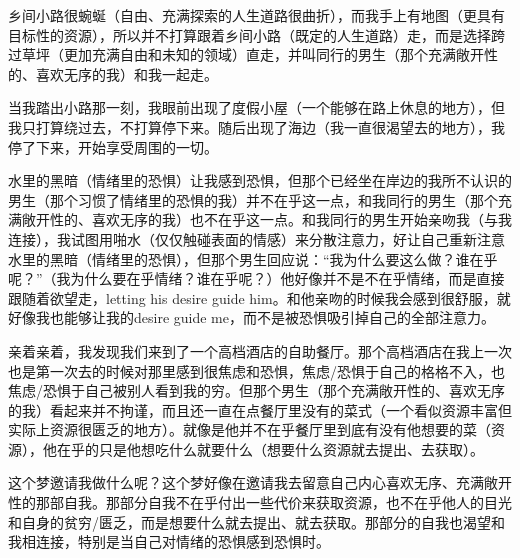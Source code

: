 乡间小路很蜿蜒（自由、充满探索的人生道路很曲折），而我手上有地图（更具有目标性的资源），所以并不打算跟着乡间小路（既定的人生道路）走，而是选择跨过草坪（更加充满自由和未知的领域）直走，并叫同行的男生（那个充满敞开性的、喜欢无序的我）和我一起走。

当我踏出小路那一刻，我眼前出现了度假小屋（一个能够在路上休息的地方），但我只打算绕过去，不打算停下来。随后出现了海边（我一直很渴望去的地方），我停了下来，开始享受周围的一切。

水里的黑暗（情绪里的恐惧）让我感到恐惧，但那个已经坐在岸边的我所不认识的男生（那个习惯了情绪里的恐惧的我）并不在乎这一点，和我同行的男生（那个充满敞开性的、喜欢无序的我）也不在乎这一点。和我同行的男生开始亲吻我（与我连接），我试图用啪水（仅仅触碰表面的情感）来分散注意力，好让自己重新注意水里的黑暗（情绪里的恐惧），但那个男生回应说：“我为什么要这么做？谁在乎呢？”（我为什么要在乎情绪？谁在乎呢？）他好像并不是不在乎情绪，而是直接跟随着欲望走，letting his desire guide him。和他亲吻的时候我会感到很舒服，就好像我也能够让我的desire guide me，而不是被恐惧吸引掉自己的全部注意力。

亲着亲着，我发现我们来到了一个高档酒店的自助餐厅。那个高档酒店在我上一次也是第一次去的时候对那里感到很焦虑和恐惧，焦虑/恐惧于自己的格格不入，也焦虑/恐惧于自己被别人看到我的穷。但那个男生（那个充满敞开性的、喜欢无序的我）看起来并不拘谨，而且还一直在点餐厅里没有的菜式（一个看似资源丰富但实际上资源很匮乏的地方）。就像是他并不在乎餐厅里到底有没有他想要的菜（资源），他在乎的只是他想吃什么就要什么（想要什么资源就去提出、去获取）。

这个梦邀请我做什么呢？这个梦好像在邀请我去留意自己内心喜欢无序、充满敞开性的那部自我。那部分自我不在乎付出一些代价来获取资源，也不在乎他人的目光和自身的贫穷/匮乏，而是想要什么就去提出、就去获取。那部分的自我也渴望和我相连接，特别是当自己对情绪的恐惧感到恐惧时。


